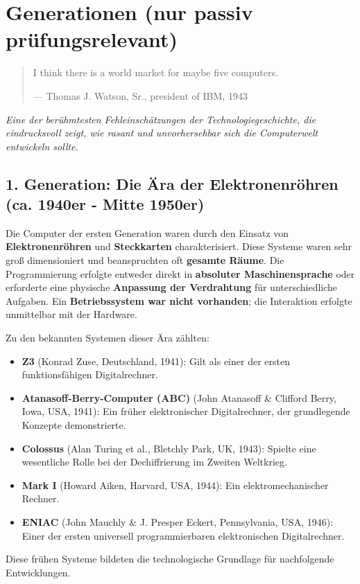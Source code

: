 \section{Generationen (nur passiv prüfungsrelevant)}

\begin{quotation}
I think there is a world market for maybe five computers.

\medskip
\noindent
--- Thomas J. Watson, Sr., president of IBM, 1943
\end{quotation}
\textit{Eine der berühmtesten Fehleinschätzungen der Technologiegeschichte, die eindrucksvoll zeigt, wie rasant und unvorhersehbar sich die Computerwelt entwickeln sollte.}


\subsection{1. Generation: Die Ära der Elektronenröhren (ca. 1940er - Mitte 1950er)}

Die Computer der ersten Generation waren durch den Einsatz von \textbf{Elektronenröhren} und \textbf{Steckkarten} charakterisiert. Diese Systeme waren sehr groß dimensioniert und beanspruchten oft \textbf{gesamte Räume}. Die Programmierung erfolgte entweder direkt in \textbf{absoluter Maschinensprache} oder erforderte eine physische \textbf{Anpassung der Verdrahtung} für unterschiedliche Aufgaben. Ein \textbf{Betriebssystem war nicht vorhanden}; die Interaktion erfolgte unmittelbar mit der Hardware.

Zu den bekannten Systemen dieser Ära zählten:
\begin{itemize}
    \item \textbf{Z3} (Konrad Zuse, Deutschland, 1941): Gilt als einer der ersten funktionsfähigen Digitalrechner.
    \item \textbf{Atanasoff-Berry-Computer (ABC)} (John Atanasoff \& Clifford Berry, Iowa, USA, 1941): Ein früher elektronischer Digitalrechner, der grundlegende Konzepte demonstrierte.
    \item \textbf{Colossus} (Alan Turing et al., Bletchly Park, UK, 1943): Spielte eine wesentliche Rolle bei der Dechiffrierung im Zweiten Weltkrieg.
    \item \textbf{Mark I} (Howard Aiken, Harvard, USA, 1944): Ein elektromechanischer Rechner.
    \item \textbf{ENIAC} (John Mauchly \& J. Presper Eckert, Pennsylvania, USA, 1946): Einer der ersten universell programmierbaren elektronischen Digitalrechner.
\end{itemize}
Diese frühen Systeme bildeten die technologische Grundlage für nachfolgende Entwicklungen.

